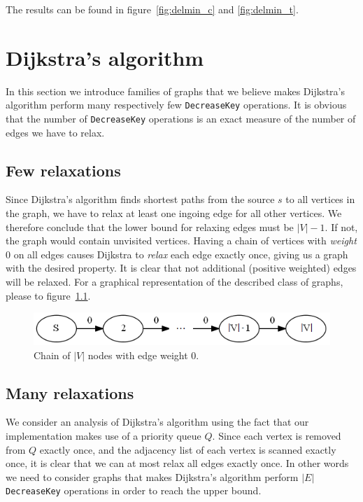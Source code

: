 \documentclass[a4paper,oneside,article,11pt]{memoir}
\begin{document}
The results can be found in figure~\ref{fig:delmin_c} and \ref{fig:delmin_t}.




\chapter{Dijkstra's algorithm}
In this section we introduce families of graphs that we believe makes Dijkstra's algorithm perform many respectively few \texttt{DecreaseKey} operations. It is obvious that the number of \texttt{DecreaseKey} operations is an exact measure of the number of edges we have to relax.

\section{Few relaxations}
Since Dijkstra's algorithm finds shortest paths from the source $s$ to all vertices in the graph, we have to relax at least one ingoing edge for all other vertices. We therefore conclude that the lower bound for relaxing edges must be $\vert V \vert -1$. If not, the graph would contain unvisited vertices. Having a chain of vertices with \textit{weight} 0 on all edges causes Dijkstra to \textit{relax} each edge exactly once, giving us a graph with the desired property. It is clear that not additional (positive weighted) edges will be relaxed. For a graphical representation of the described class of graphs, please to figure~\ref{figure:graph_chain}.

\begin{figure}
\centering
\includegraphics[scale=1]{../figures/graph_chain.png}
\caption{Chain of $\vert V \vert$ nodes with edge weight 0.}
\label{figure:graph_chain}
\end{figure}

\section{Many relaxations}
We consider an analysis of Dijkstra's algorithm using the fact that our implementation makes use of a priority queue $Q$. Since each vertex is removed from $Q$ exactly once, and the adjacency list of each vertex is scanned exactly once, it is clear that we can at most relax all edges exactly once.
In other words we need to consider graphs that makes Dijkstra's algorithm perform $\vert E \vert$ \texttt{DecreaseKey} operations in order to reach the upper bound.
\end{document}
